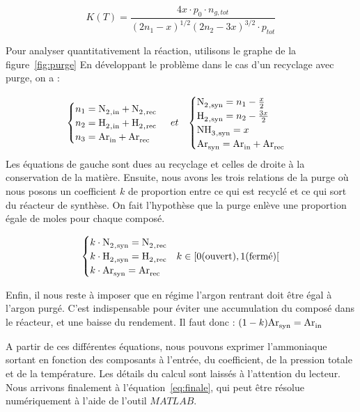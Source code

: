 $$K(T) = \frac{4x\cdot p_0\cdot n_{g,tot}}{(2n_1 - x)^{1/2} (2n_2 - 3x)^{3/2} \cdot p_{tot}}$$

Pour analyser quantitativement la réaction, utilisons le graphe de la figure~\ref{fig:purge}
En développant le problème dans le cas d'un recyclage avec purge, on a :

\begin{align}
\notag
\begin{cases}
 n_1 = \ce{N2_{,in} + N2_{,rec}} \\
 n_2 = \ce{H2_{,in} + H2_{,rec}} \\
 n_3 = \ce{Ar_{in} + Ar_{rec}} \\
\end{cases}
 &  ~et  &
\begin{cases}
 \ce{N2_{,syn}} = n_1 - \frac{x}{2} \\
 \ce{H2_{,syn}} = n_2 - \frac{3x}{2} \\
 \ce{NH3_{,syn}} = x \\
 \ce{Ar_{syn} = Ar_{in} + Ar_{rec}} \\ 
\end{cases}
\\
\end{align}
Les équations de gauche sont dues au recyclage et celles de droite à la conservation de la matière.
Ensuite, nous avons les trois relations de la purge où nous posons un coefficient $k$ de proportion entre ce qui est recyclé et ce qui sort du réacteur de synthèse. On fait l'hypothèse que la purge enlève une proportion égale de moles pour chaque composé.

$$
\begin{cases}
 k\cdot \ce{N2_{,syn}} = \ce{N2_{,rec}} \\ 
 k\cdot \ce{H2_{,syn}} = \ce{H2_{,rec}} & k \in [0 \text{(ouvert)}, 1 \text{(fermé)}[ \\
 k\cdot \ce{Ar_{syn}} = \ce{Ar_{rec}} \\
\end{cases}
$$

Enfin, il nous reste à imposer que en régime l'argon rentrant doit être égal à l'argon purgé. C'est indispensable pour éviter une accumulation du composé dans le réacteur, et une baisse du rendement. Il faut donc : $(1 - k)\ce{Ar_{syn}} = \ce{Ar_{in}}$

A partir de ces différentes équations, nous pouvons exprimer l'ammoniaque sortant en fonction des composants à l'entrée, du coefficient, de la pression totale et de la température. Les détails du calcul sont laissés à l'attention du lecteur. Nous arrivons finalement à l'équation~\eqref{eq:finale}, qui peut être résolue numériquement à l'aide de l'outil $MATLAB$.  

